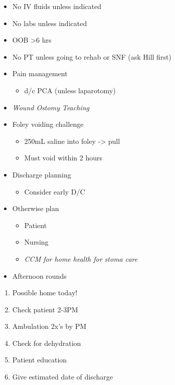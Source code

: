 \documentclass[
  letterpaper,
]{scrbook}
\providecommand{\tightlist}{%
  \setlength{\itemsep}{0pt}\setlength{\parskip}{0pt}}
\begin{document}
\begin{itemize}
\tightlist
\item
  No IV fluids unless indicated
\item
  No labs unless indicated
\item
  OOB \textgreater6 hrs
\item
  No PT unless going to rehab or SNF (ask Hill first)
\item
  Pain management

  \begin{itemize}
  \tightlist
  \item
    d/c PCA (unless laparotomy)
  \end{itemize}
\item
  \emph{Wound Ostomy Teaching}
\item
  Foley voiding challenge

  \begin{itemize}
  \tightlist
  \item
    250mL saline into foley -\textgreater{} pull
  \item
    Must void within 2 hours
  \end{itemize}
\item
  Discharge planning

  \begin{itemize}
  \tightlist
  \item
    Consider early D/C
  \end{itemize}
\item
  Otherwise plan

  \begin{itemize}
  \tightlist
  \item
    Patient
  \item
    Nursing
  \item
    \emph{CCM for home health for stoma care}
  \end{itemize}
\item
  Afternoon rounds
\end{itemize}

\begin{enumerate}
\def\labelenumi{\arabic{enumi})}
\tightlist
\item
  Possible home today!
\item
  Check patient 2-3PM
\item
  Ambulation 2x's by PM
\item
  Check for dehydration
\item
  Patient education
\item
  Give estimated date of discharge
\end{enumerate}
\end{document}

